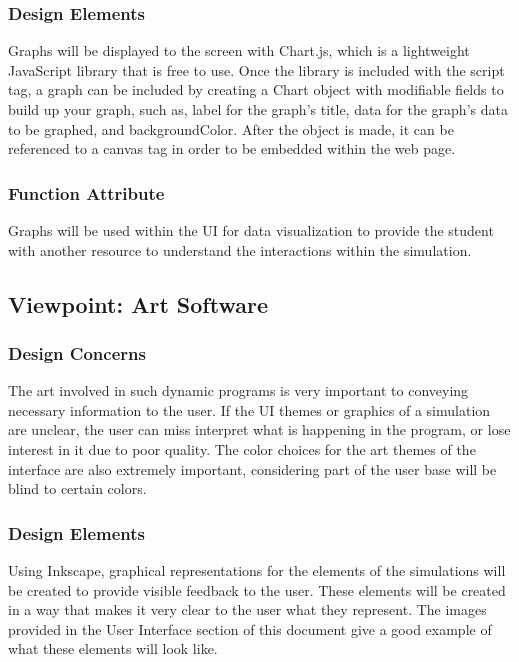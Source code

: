 \documentclass[onecolumn, draftclsnofoot,10pt, compsoc]{IEEEtran}
\begin{document}
\subsubsection{Design Elements}
 Graphs will be displayed to the screen with Chart.js, which is a lightweight JavaScript library that is free to use. Once the library is included with the script tag, a graph can be included by creating a Chart object with modifiable fields to build up your graph, such as, label for the graph's title, data for the graph's data to be graphed, and backgroundColor. After the object is made, it can be referenced to a canvas tag in order to be embedded within the web page.

\subsubsection{Function Attribute}
Graphs will be used within the UI for data visualization to provide the student with another resource to understand the interactions within the simulation.


\subsection{Viewpoint: Art Software}

\subsubsection{Design Concerns}
The art involved in such dynamic programs is very important to conveying necessary information to the user. If the UI themes or graphics of a simulation are unclear, the user can miss interpret what is happening in the program, or lose interest in it due to poor quality. The color choices for the art themes of the interface are also extremely important, considering part of the user base will be blind to certain colors.

\subsubsection{Design Elements}
Using Inkscape, graphical representations for the elements of the simulations will be created to provide visible feedback to the user. These elements will be created in a way that makes it very clear to the user what they represent. The images provided in the User Interface section of this document give a good example of what these elements will look like.
\end{document}
